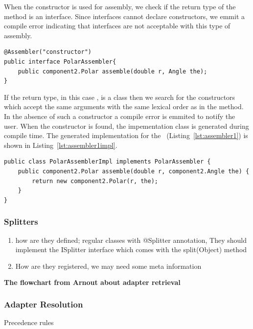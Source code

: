 When the constructor is used for assembly, we check if the return type of the  method is an interface. 
Since interfaces cannot declare constructors, we emmit a compile error indicating that interfaces are not acceptable with this type of assembly. 
\begin{lstlisting}[float, caption={An example Assembler with ``constructor'' type}, label={lst:assembler1}]
@Assembler("constructor")
public interface PolarAssembler{
	public component2.Polar assemble(double r, Angle the);
}
\end{lstlisting}
If the return type, in this case , is a class then we search for the constructors which accept the same arguments with the same lexical order as in the  method.
In the absence of such a constructor a compile error is emmited to notify the user. 
When the constructor is found, the impementation class is generated during compile time.  
The generated implementation for the ~(Listing~\ref{lst:assembler1}) is shown in Listing~\ref{lst:assembler1impl}.
\begin{lstlisting}[float, caption={The generated implmentation of the \lstinln{PolarAssembler} in Listing~\ref{lst:assembler1}}, label={lst:assembler1impl}]
public class PolarAssemblerImpl implements PolarAssembler {
	public component2.Polar assemble(double r, component2.Angle the) {
		return new component2.Polar(r, the);
	}
}
\end{lstlisting}


\subsubsection{Splitters}
\begin{enumerate}
\item how are they defined; regular classes with @Splitter annotation, They should implement the ISplitter interface which comes with the split(Object) method
\item How are they registered, we may need some meta information
\end{enumerate}



\textbf{The flowchart from Arnout about adapter retrieval}

\subsubsection{Adapter Resolution}
Precedence rules


